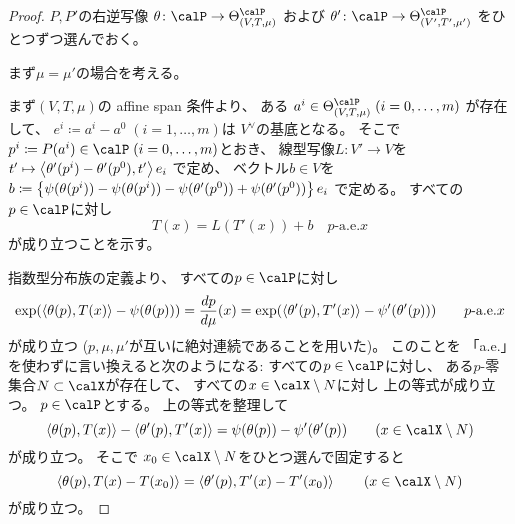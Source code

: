 \documentclass[report]{jlreq}
\begin{document}
\begin{proof}
    $P, P'$の右逆写像
    $\theta \colon \calP \to \Theta^\calP_{(V, T, \mu)}$
    および
    $\theta' \colon \calP \to \Theta^\calP_{(V', T', \mu')}$
    をひとつずつ選んでおく。

    まず$\mu = \mu'$の場合を考える。

    まず$(V, T, \mu)$の affine span 条件より、
    ある
    $a^i \in \Theta^\calP_{(V, T, \mu)} \; (i = 0, \dots, m)$
    が存在して、
    $e^i \coloneqq a^i - a^0 \; (i = 1, \dots, m)$は
    $V^\vee$の基底となる。
    そこで$p^i \coloneqq P(a^i) \in \calP \; (i = 0, \dots, m)$とおき、
    線型写像$L \colon V' \to V$を
    $t' \mapsto
        \left\langle{\theta'(p^i) - \theta'(p^0)},{t'}\right\rangle e_i$
    で定め、
    ベクトル$b \in V$を
    $b \coloneqq
        \left\{{
            \psi(\theta(p^i)) - \psi(\theta(p^i))
            - \psi(\theta'(p^0)) + \psi(\theta'(p^0))
        }\right\} e_i$
    で定める。
    すべての$p \in \calP$に対し
    \begin{equation}
        T(x) = L(T'(x)) + b
            \quad
            \text{$p$-a.e.$x$}
    \end{equation}
    が成り立つことを示す。

    指数型分布族の定義より、
    すべての$p \in \calP$に対し
    \begin{equation}
        \exp(\myangle{\theta(p)}{T(x)} - \psi(\theta(p)))
            =
                \dd[p]{\mu}(x)
            =
                \exp(\myangle{\theta'(p)}{T'(x)} - \psi'(\theta'(p)))
            \qquad
                \text{$p$-a.e.$x$}
    \end{equation}
    が成り立つ ($p, \mu, \mu'$が互いに絶対連続であることを用いた)。
    このことを
    「a.e.」を使わずに言い換えると次のようになる:
    すべての$p \in \calP$に対し、
    ある$p$-零集合$N \subset \calX$が存在して、
    すべての$x \in \calX \setminus N$に対し
    上の等式が成り立つ。
    $p \in \calP$とする。
    上の等式を整理して
    \begin{equation}
        \myangle{\theta(p)}{T(x)}
            - \myangle{\theta'(p)}{T'(x)}
            =
                \psi(\theta(p))
                - \psi'(\theta'(p))
            \qquad
                (x \in \calX \setminus N)
    \end{equation}
    が成り立つ。
    そこで
    $x_0 \in \calX \setminus N$をひとつ選んで固定すると
    \begin{equation}
        \myangle{\theta(p)}{T(x) - T(x_0)}
            =
                \myangle{\theta'(p)}{T'(x) - T'(x_0)}
            \qquad
                (x \in \calX \setminus N)
    \end{equation}
    が成り立つ。


\end{proof}
\end{document}
